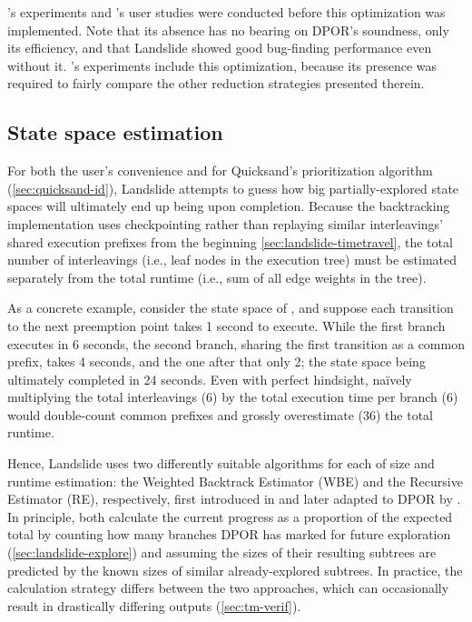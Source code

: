 's experiments and 's user studies
were conducted before this optimization was implemented.
Note that its absence has no bearing on DPOR's soundness, only its efficiency,
and that Landslide showed good bug-finding performance even without it.
's experiments include this optimization,
because its presence was required to fairly compare the other reduction strategies presented therein.


\subsection{State space estimation}
\label{sec:landslide-estimate}

For both the user's convenience and for Quicksand's prioritization algorithm (\cref{sec:quicksand-id}),
Landslide attempts to guess how big partially-explored state spaces will ultimately end up being upon completion.
Because the backtracking implementation uses checkpointing
rather than replaying similar interleavings' shared execution prefixes from the beginning \cref{sec:landslide-timetravel},
the total number of interleavings (i.e., leaf nodes in the execution tree)
must be estimated separately from the total runtime (i.e., sum of all edge weights in the tree).

As a concrete example, consider the state space of ,
and suppose each transition to the next preemption point takes 1 second to execute.
While the first branch executes in 6 seconds,
the second branch, sharing the first transition as a common prefix, takes 4 seconds,
and the one after that only 2;
the state space being ultimately completed in 24 seconds.
Even with perfect hindsight,
na\"ively multiplying the total interleavings (6)
by the total execution time per branch (6) would double-count common prefixes
and grossly overestimate (36) the total runtime.

Hence, Landslide uses two differently suitable algorithms for each of size and runtime estimation:
the Weighted Backtrack Estimator (WBE) and the Recursive Estimator (RE), respectively,
first introduced in \cite{estimating-search-tree-size} and later adapted to DPOR by \cite{estimation}.
In principle, both calculate the current progress as a proportion of the expected total
by counting how many branches DPOR has marked for future exploration (\cref{sec:landslide-explore})
and assuming the sizes of their resulting subtrees are predicted by the known sizes of similar already-explored subtrees.
In practice, the calculation strategy differs between the two approaches,
which can occasionally result in drastically differing outputs (\cref{sec:tm-verif}).

